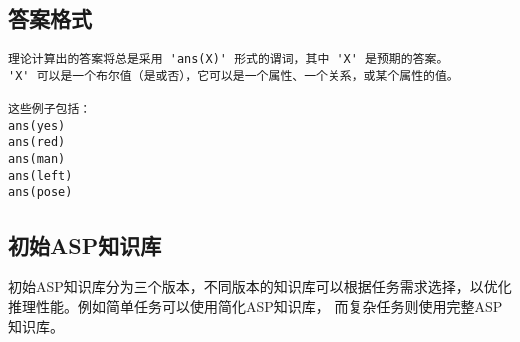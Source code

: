 \subsection{答案格式}
\begin{lstlisting}
理论计算出的答案将总是采用 'ans(X)' 形式的谓词，其中 'X' 是预期的答案。
'X' 可以是一个布尔值（是或否），它可以是一个属性、一个关系，或某个属性的值。

这些例子包括：
ans(yes)
ans(red)
ans(man)
ans(left)
ans(pose)
\end{lstlisting}
\subsection{初始ASP知识库}
\label{appendix:initial-theory}
初始ASP知识库分为三个版本，不同版本的知识库可以根据任务需求选择，以优化推理性能。例如简单任务可以使用简化ASP知识库，
而复杂任务则使用完整ASP知识库。
